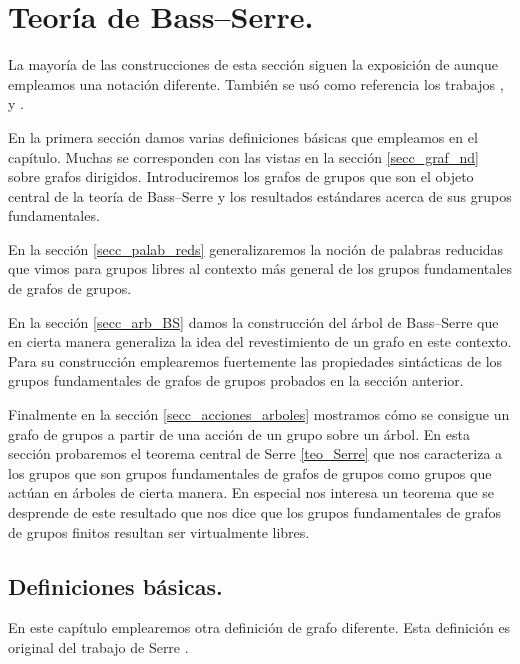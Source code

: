 \documentclass[tesis.tex]{subfiles}
\begin{document}
\chapter{Teoría de Bass--Serre.}\label{cap_BS}

La mayoría de las construcciones de esta sección siguen la exposición de \cite{serre2002trees} aunque empleamos una notación diferente. 
También se usó como referencia los trabajos \cite{scott1979topological}, \cite{diekert2017context} y \cite{dicks1989groups}.

En la primera sección damos varias definiciones básicas que empleamos en el capítulo. 
Muchas se corresponden con las vistas en la sección \ref{secc_graf_nd} sobre grafos dirigidos.
Introduciremos los grafos de grupos que son el objeto central de la teoría de Bass--Serre y los resultados estándares acerca de sus grupos fundamentales.

En la sección \ref{secc_palab_reds} generalizaremos la noción de palabras reducidas que vimos para grupos libres al contexto más general de los grupos fundamentales de grafos de grupos.

En la sección \ref{secc_arb_BS} damos la construcción del árbol de Bass--Serre que en cierta manera generaliza la idea del revestimiento de un grafo en este contexto.
Para su construcción emplearemos fuertemente las propiedades sintácticas de los grupos fundamentales de grafos de grupos probados en la sección anterior.

Finalmente en la sección \ref{secc_acciones_arboles} mostramos cómo se consigue un grafo de grupos a partir de una acción de un grupo sobre un árbol.
En esta sección probaremos el teorema central de Serre \ref{teo_Serre} que nos caracteriza a los grupos que son grupos fundamentales de grafos de grupos como grupos que actúan en árboles de cierta manera.
En especial nos interesa un teorema que se desprende de este resultado que nos dice que los grupos fundamentales de grafos de grupos finitos resultan ser virtualmente libres. 



\section{Definiciones básicas.}\label{secc_defs_basicas}

En este capítulo emplearemos otra definición de grafo diferente. 
Esta definición es original del trabajo de Serre \cite{serre2002trees}. 
\end{document}
